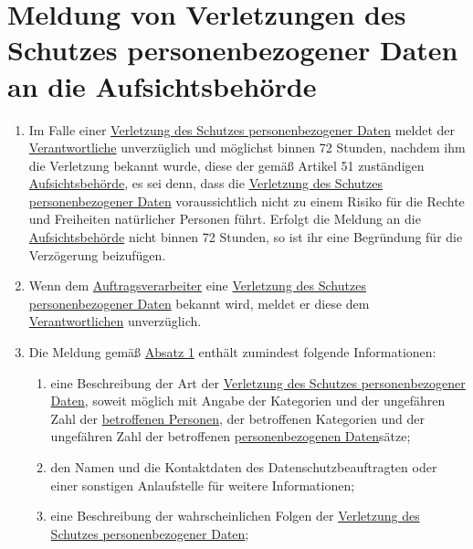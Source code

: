 \chapter{Meldung von Verletzungen des Schutzes personenbezogener Daten an die Aufsichtsbehörde}
\label{ch:33}


\begin{enumerate}

  \item Im Falle einer \hyperref[itm:04-12]{Verletzung des Schutzes personenbezogener Daten} meldet der \hyperref[itm:04-7]{Verantwortliche} unverzüglich und
   möglichst binnen 72 Stunden, nachdem ihm die Verletzung bekannt wurde, diese der gemäß Artikel 51 zuständigen
   \hyperref[itm:04-21]{Aufsichtsbehörde}, es sei denn, dass die \hyperref[itm:04-12]{Verletzung des Schutzes personenbezogener Daten} voraussichtlich nicht zu
   einem Risiko für die Rechte und Freiheiten natürlicher Personen führt. Erfolgt die Meldung an die \hyperref[itm:04-21]{Aufsichtsbehörde}
   nicht binnen 72 Stunden, so ist ihr eine Begründung für die Verzögerung beizufügen.
  \label{itm:33-1}

  \item Wenn dem \hyperref[itm:04-8]{Auftragsverarbeiter} eine \hyperref[itm:04-12]{Verletzung des Schutzes personenbezogener Daten} bekannt wird, meldet er diese
   dem \hyperref[itm:04-7]{Verantwortlichen} unverzüglich.
  \label{itm:33-2}

  \item Die Meldung gemäß \hyperref[itm:33-1]{Absatz 1} enthält zumindest folgende Informationen:
  \label{itm:33-3}

  \begin{enumerate}
  
    \item eine Beschreibung der Art der \hyperref[itm:04-12]{Verletzung des Schutzes personenbezogener Daten}, soweit möglich mit Angabe der
     Kategorien und der ungefähren Zahl der \hyperref[itm:04-1]{betroffenen Personen}, der betroffenen Kategorien und der ungefähren Zahl
     der betroffenen \hyperref[itm:04-1]{personenbezogenen Daten}sätze;
    \label{itm:33-3a}

    \item den Namen und die Kontaktdaten des Datenschutzbeauftragten oder einer sonstigen Anlaufstelle für weitere
     Informationen;
    \label{itm:33-3b}

    \item eine Beschreibung der wahrscheinlichen Folgen der \hyperref[itm:04-12]{Verletzung des Schutzes personenbezogener Daten};
    \label{itm:33-3c}


\end{enumerate}
\end{enumerate}
